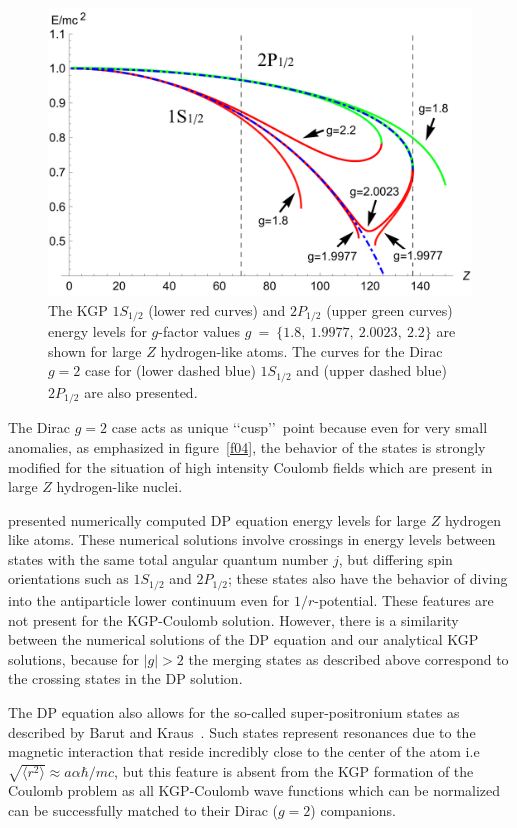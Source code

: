 \begin{figure}
 \centering
 \includegraphics[width=\linewidth]{plots/chap02moment/lanplot08.pdf}
 \caption[]{The KGP $1S_{1/2}$ (lower red curves) and $2P_{1/2}$ (upper green curves) energy levels for $g$-factor values $g~=~\{1.8,\ 1.9977,\ 2.0023,\ 2.2\}$ are shown for large $Z$ hydrogen-like atoms. The curves for the Dirac $g=2$ case for (lower dashed blue) $1S_{1/2}$ and (upper dashed blue) $2P_{1/2}$ are also presented.}
 \label{f03}
\end{figure}

The Dirac $g=2$ case acts as unique \lq\lq cusp\rq\rq\ point because even for very small anomalies, as emphasized in figure~\ref{f04}, the behavior of the states is strongly modified for the situation of high intensity Coulomb fields which are present in large $Z$ hydrogen-like nuclei.

\cite{Thaller:1992ji} presented numerically computed DP equation energy levels for large $Z$ hydrogen like atoms. These numerical solutions involve crossings in energy levels between states with the same total angular quantum number $j$, but differing spin orientations such as $1S_{1/2}$ and $2P_{1/2}$; these states also have the behavior of diving into the antiparticle lower continuum even for $1/r$-potential. These features are not present for the KGP-Coulomb solution. However, there is a similarity between the numerical solutions of the DP equation and our analytical KGP solutions, because for $|g|>2$ the merging states as described above correspond to the crossing states in the DP solution.

The DP equation also allows for the so-called super-positronium states as described by Barut and Kraus~\cite{Barut:1975hz,Barut:1976hs}. Such states represent resonances due to the magnetic interaction that reside incredibly close to the center of the atom i.e $\sqrt{\langle r^{2}\rangle}\approx a\alpha\hbar/mc$, but this feature is absent from the KGP formation of the Coulomb problem as all KGP-Coulomb wave functions which can be normalized can be successfully matched to their Dirac ($g=2$) companions.

